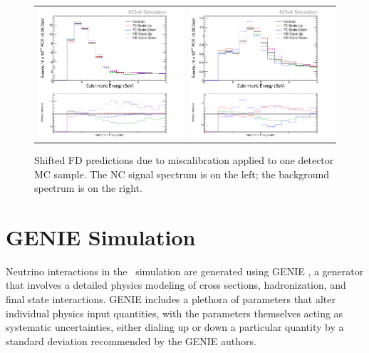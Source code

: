\begin{figure}[p]
  \centering
  \begin{tabular}{c c}
    \includegraphics[width=.47\textwidth]{figures/Systs/cNCEXCalibRelSysts.png} &
    \includegraphics[width=.47\linewidth]{figures/Systs/cBGEXCalibRelSysts.png} \\
  \end{tabular}
  \caption[Shifted FD Predictions Due to Miscalibration at One Detector]{Shifted FD predictions due to miscalibration applied to one detector MC sample. The NC signal spectrum is on the left; the background spectrum is on the right.}
  \label{fig:SystCalibRel}
\end{figure}

\section{GENIE Simulation}
\label{sec:SystGENIE}

Neutrino interactions in the \nova~simulation are generated using GENIE \cite{ref:GENIE}, a generator that involves a detailed physics modeling of cross sections, hadronization, and final state interactions. GENIE includes a plethora of parameters that alter individual physics input quantities, with the parameters themselves acting as systematic uncertainties, either dialing up or down a particular quantity by a standard deviation recommended by the GENIE authors.

